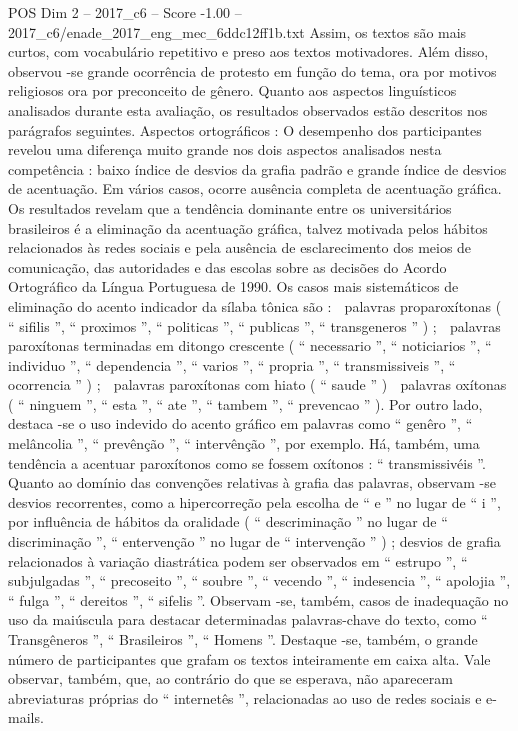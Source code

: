 \begin{textsample}{POS Dim 2 – 2017\_c6 – Score -1.00 – 2017\_c6/enade\_2017\_eng\_mec\_6ddc12ff1b.txt}
Assim, os textos são mais curtos, com vocabulário repetitivo e preso aos textos motivadores.
Além disso, observou -se grande ocorrência de protesto em função do tema, ora por motivos religiosos ora por preconceito de gênero.
Quanto aos aspectos linguísticos analisados durante esta avaliação, os resultados observados estão descritos nos parágrafos seguintes.
Aspectos ortográficos : O desempenho dos participantes revelou uma diferença muito grande nos dois aspectos analisados nesta competência : baixo índice de desvios da grafia padrão e grande índice de desvios de acentuação.
Em vários casos, ocorre ausência completa de acentuação gráfica.
Os resultados revelam que a tendência dominante entre os universitários brasileiros é a eliminação da acentuação gráfica, talvez motivada pelos hábitos relacionados às redes sociais e pela ausência de esclarecimento dos meios de comunicação, das autoridades e das escolas sobre as decisões do Acordo Ortográfico da Língua Portuguesa de 1990.
Os casos mais sistemáticos de eliminação do acento indicador da sílaba tônica são :  palavras proparoxítonas ( “ sifilis ”, “ proximos ”, “ politicas ”, “ publicas ”, “ transgeneros ” ) ;  palavras paroxítonas terminadas em ditongo crescente ( “ necessario ”, “ noticiarios ”, “ individuo ”, “ dependencia ”, “ varios ”, “ propria ”, “ transmissiveis ”, “ ocorrencia ” ) ;  palavras paroxítonas com hiato ( “ saude ” )  palavras oxítonas ( “ ninguem ”, “ esta ”, “ ate ”, “ tambem ”, “ prevencao ” ).
Por outro lado, destaca -se o uso indevido do acento gráfico em palavras como “ genêro ”, “ melâncolia ”, “ prevênção ”, “ intervênção ”, por exemplo.
Há, também, uma tendência a acentuar paroxítonos como se fossem oxítonos : “ transmissivéis ”.
Quanto ao domínio das convenções relativas à grafia das palavras, observam -se desvios recorrentes, como a hipercorreção pela escolha de “ e ” no lugar de “ i ”, por influência de hábitos da oralidade ( “ descriminação ” no lugar de “ discriminação ”, “ entervenção ” no lugar de “ intervenção ” ) ; desvios de grafia relacionados à variação diastrática podem ser observados em “ estrupo ”, “ subjulgadas ”, “ precoseito ”, “ soubre ”, “ vecendo ”, “ indesencia ”, “ apolojia ”, “ fulga ”, “ dereitos ”, “ sifelis ”.
Observam -se, também, casos de inadequação no uso da maiúscula para destacar determinadas palavras-chave do texto, como “ Transgêneros ”, “ Brasileiros ”, “ Homens ”.
Destaque -se, também, o grande número de participantes que grafam os textos inteiramente em caixa alta.
Vale observar, também, que, ao contrário do que se esperava, não apareceram abreviaturas próprias do “ internetês ”, relacionadas ao uso de redes sociais e e-mails.

\end{textsample}
